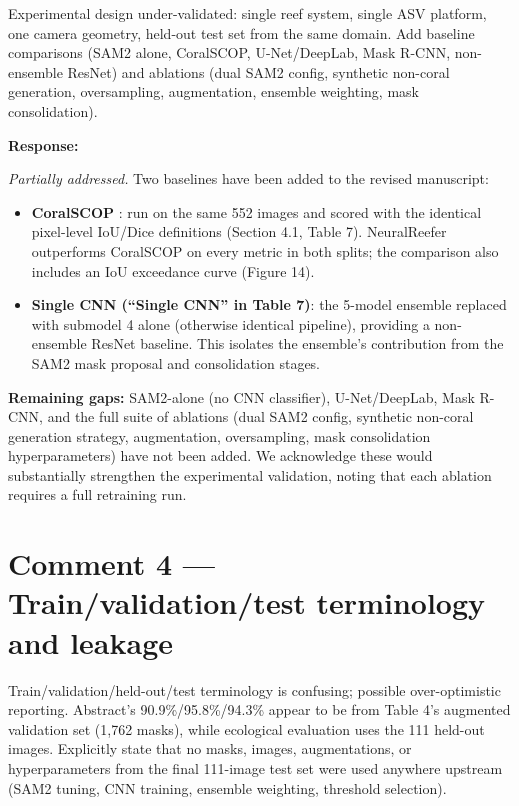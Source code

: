 \documentclass[12pt]{article}
\newenvironment{reviewercomment}{%
  \begin{mdframed}[backgroundcolor=gray!10,linecolor=gray!40,
                   leftmargin=0pt,rightmargin=0pt,
                   innerleftmargin=8pt,innerrightmargin=8pt,
                   innertopmargin=6pt,innerbottommargin=6pt]
  \itshape\color{quotegray}%
}{%
  \end{mdframed}%
}
\newenvironment{response}{%
  \vspace{4pt}%
  \color{respblue}%
  \noindent\textbf{Response:}\space
}{%
  \vspace{10pt}%
}
\begin{document}
\begin{reviewercomment}
Experimental design under-validated: single reef system, single ASV platform,
one camera geometry, held-out test set from the same domain.  Add baseline
comparisons (SAM2 alone, CoralSCOP, U-Net/DeepLab, Mask R-CNN, non-ensemble
ResNet) and ablations (dual SAM2 config, synthetic non-coral generation,
oversampling, augmentation, ensemble weighting, mask consolidation).
\end{reviewercomment}

\begin{response}
\textit{Partially addressed.}  Two baselines have been added to the revised
manuscript:

\begin{itemize}[topsep=2pt,itemsep=2pt]
  \item \textbf{CoralSCOP} \citep{zheng2024}: run on the same 552
    images and scored with the identical pixel-level IoU/Dice definitions
    (Section 4.1, Table 7).  NeuralReefer outperforms CoralSCOP on every
    metric in both splits; the comparison also includes an IoU exceedance
    curve (Figure 14).
  \item \textbf{Single CNN (``Single CNN'' in Table 7)}: the 5-model ensemble
    replaced with submodel 4 alone (otherwise identical pipeline), providing a
    non-ensemble ResNet baseline.  This isolates the ensemble's contribution
    from the SAM2 mask proposal and consolidation stages.
\end{itemize}

\textbf{Remaining gaps:}  SAM2-alone (no CNN classifier), U-Net/DeepLab,
Mask R-CNN, and the full suite of ablations (dual SAM2 config, synthetic
non-coral generation strategy, augmentation, oversampling, mask consolidation
hyperparameters) have not been added.  We acknowledge these would substantially
strengthen the experimental validation, noting that each ablation requires a full retraining run.
\end{response}

\section*{Comment 4 --- Train/validation/test terminology and leakage}

\begin{reviewercomment}
Train/validation/held-out/test terminology is confusing; possible
over-optimistic reporting.  Abstract's 90.9\%/95.8\%/94.3\% appear to be from
Table 4's augmented validation set (1,762 masks), while ecological evaluation
uses the 111 held-out images.  Explicitly state that no masks, images,
augmentations, or hyperparameters from the final 111-image test set were used
anywhere upstream (SAM2 tuning, CNN training, ensemble weighting, threshold
selection).
\end{reviewercomment}
\end{document}
